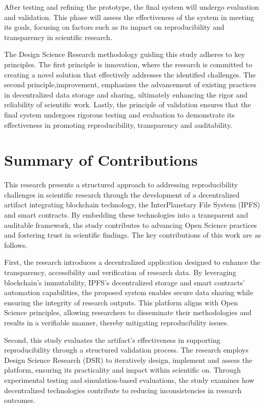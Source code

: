 \documentclass[final]{rc-book-2.14}
\begin{document}
After testing and refining the prototype, the final system will undergo evaluation and validation. This phase will assess the effectiveness of the system in meeting its goals, focusing on factors such as its impact on reproducibility and transparency in scientific research.

The Design Science Research methodology guiding this study adheres to key principles. The first principle is innovation, where the research is committed to creating a novel solution that effectively addresses the identified challenges. The second principle,improvement, emphasizes the advancement of existing practices in decentralized data storage and sharing, ultimately enhancing the rigor and reliability of scientific work. Lastly, the principle of validation ensures that the final system undergoes rigorous testing and evaluation to demonstrate its effectiveness in promoting reproducibility, transparency and auditability.



\section{Summary of Contributions}
\label{sec:introduction:contributions}

This research presents a structured approach to addressing reproducibility challenges in scientific research through the development of a decentralized artifact integrating blockchain technology, the InterPlanetary File System (IPFS) and smart contracts. By embedding these technologies into a transparent and auditable framework, the study contributes to advancing Open Science practices and fostering trust in scientific findings. The key contributions of this work are as follows.

First, the research introduces a decentralized application designed to enhance the transparency, accessibility and verification of research data. By leveraging blockchain's immutability, IPFS’s decentralized storage and smart contracts’ automation capabilities, the proposed system enables secure data sharing while ensuring the integrity of research outputs. This platform aligns with Open Science principles, allowing researchers to disseminate their methodologies and results in a verifiable manner, thereby mitigating reproducibility issues.

Second, this study evaluates the artifact’s effectiveness in supporting reproducibility through a structured validation process. The research employs Design Science Research (DSR) to iteratively design, implement and assess the platform, ensuring its practicality and impact within scientific on. Through experimental testing and simulation-based evaluations, the study examines how decentralized technologies contribute to reducing inconsistencies in research outcomes.
\end{document}
